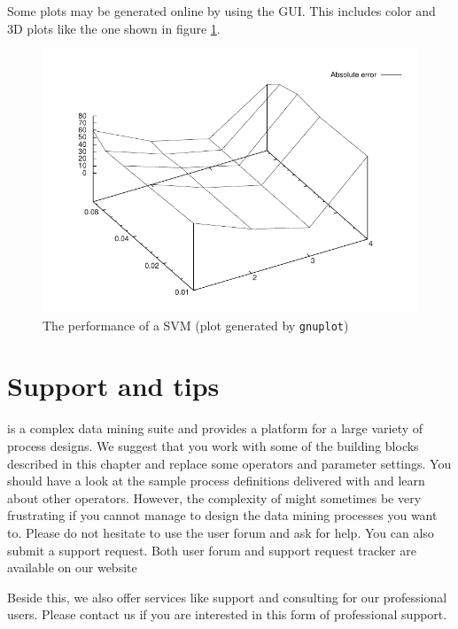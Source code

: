 Some plots may be generated online by using the GUI. This includes color and
3D plots like the one shown in figure
\ref{fig:svm_degree_epsilon_chart}.



\begin{figure}[htbp]
\includegraphics{graphics/svm_degree_epsilon.pdf}
\caption[Plot of the performance of a SVM]{The performance of a SVM (plot generated by {\tt gnuplot})}
\label{fig:svm_degree_epsilon_chart}
\end{figure}


\section{Support and tips}

\rapidminer is a complex data mining suite and provides a platform for a large
variety of process designs. We suggest that you work with some of the
building blocks described in this chapter and replace some operators and
parameter settings. You should have a look at the sample process definitions delivered
with \rapidminer and learn about other operators. However, the complexity of \rapidminer
might sometimes be very frustrating if you cannot manage to design the data
mining processes you want to. Please do not hesitate to use the user forum
and ask for help. You can also submit a support request. Both user forum
and support request tracker are available on our website
\begin{center}
\rapidminerurl
\end{center}
Beside this, we also offer services like support and consulting for our professional
users. Please contact us if you are interested in this form of professional support.

